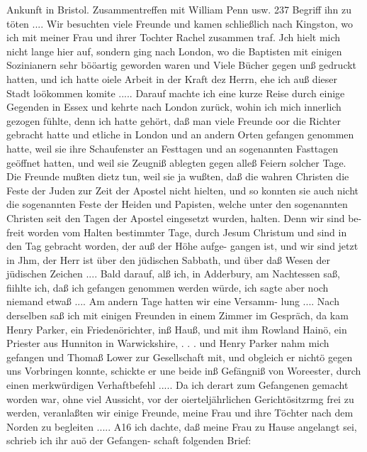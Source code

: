 Ankunft in Bristol. Zusammentreffen mit William Penn usw. 237
Begriff ihn zu töten .... Wir besuchten viele Freunde und
kamen schließlich nach Kingston, wo ich mit meiner Frau und
ihrer Tochter Rachel zusammen traf. Jch hielt mich nicht lange
hier auf, sondern ging nach London, wo die Baptisten mit einigen
Sozinianern sehr bööartig geworden waren und Viele Bücher gegen
unß gedruckt hatten, und ich hatte oiele Arbeit in der Kraft dez
Herrn, ehe ich auß dieser Stadt loökommen komite .....
Darauf machte ich eine kurze Reise durch einige Gegenden
in Essex und kehrte nach London zurück, wohin ich mich innerlich
gezogen fühlte, denn ich hatte gehört, daß man viele Freunde
oor die Richter gebracht hatte und etliche in London und an andern
Orten gefangen genommen hatte, weil sie ihre Schaufenster an
Festtagen und an sogenannten Fasttagen geöffnet hatten, und
weil sie Zeugniß ablegten gegen alleß Feiern solcher Tage. Die
Freunde mußten dietz tun, weil sie ja wußten, daß die wahren
Christen die Feste der Juden zur Zeit der Apostel nicht hielten,
und so konnten sie auch nicht die sogenannten Feste der Heiden
und Papisten, welche unter den sogenannten Christen seit den
Tagen der Apostel eingesetzt wurden, halten. Denn wir sind be-
freit worden vom Halten bestimmter Tage, durch Jesum Christum
und sind in den Tag gebracht worden, der auß der Höhe aufge-
gangen ist, und wir sind jetzt in Jhm, der Herr ist über den
jüdischen Sabbath, und über daß Wesen der jüdischen Zeichen ....
Bald darauf, alß ich, in Adderbury, am Nachtessen saß, fiihlte
ich, daß ich gefangen genommen werden würde, ich sagte aber noch
niemand etwaß .... Am andern Tage hatten wir eine Versamm-
lung .... Nach derselben saß ich mit einigen Freunden in einem
Zimmer im Gespräch, da kam Henry Parker, ein Friedenörichter,
inß Hauß, und mit ihm Rowland Hainö, ein Priester aus Hunniton
in Warwickshire, . . . und Henry Parker nahm mich gefangen und
Thomaß Lower zur Gesellschaft mit, und obgleich er nichtö gegen
uns Vorbringen konnte, schickte er une beide inß Gefängniß von
Woreester, durch einen merkwürdigen Verhaftbefehl .....
Da ich derart zum Gefangenen gemacht worden war, ohne viel
Aussicht, vor der oierteljährlichen Gerichtösitzrmg frei zu werden,
veranlaßten wir einige Freunde, meine Frau und ihre Töchter
nach dem Norden zu begleiten ..... A16 ich dachte, daß meine
Frau zu Hause angelangt sei, schrieb ich ihr auö der Gefangen-
schaft folgenden Brief:


